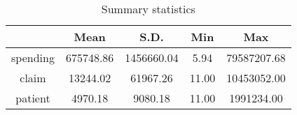 \begin{table}[ht]
\centering
\begin{tabular}{ccccc}
  \hline
  & Mean & S.D. & Min & Max \\ 
  \hline
spending & 675748.86 & 1456660.04 & 5.94 & 79587207.68 \\ 
  claim & 13244.02 & 61967.26 & 11.00 & 10453052.00 \\ 
  patient & 4970.18 & 9080.18 & 11.00 & 1991234.00 \\ 
   \hline
\end{tabular}
\caption{Summary statistics} 
\label{tab:sum_stat}
\end{table}

